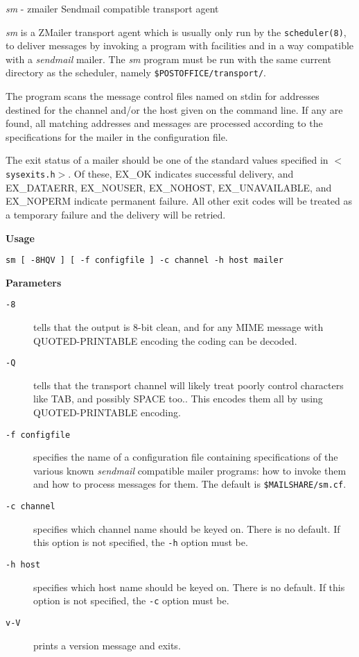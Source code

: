 {\em sm\/} - zmailer Sendmail compatible transport agent

{\em sm\/} is a ZMailer transport agent which is usually only run
by the {\tt scheduler(8)}, to deliver messages by invoking a
program with facilities and in a way compatible with a
{\em sendmail\/} mailer. The {\em sm\/} program must be run with the same
current directory as the scheduler, namely 
{\tt \$POSTOFFICE/transport/}.

The program scans the message control files named on stdin
for addresses destined for the channel and/or the host
given on the command line. If any are found, all matching
addresses and messages are processed according to the
specifications for the mailer in the configuration file.

The exit status of a mailer should be one of the standard
values specified in {\tt {\(<\)}sysexits.h{\(>\)}}. Of these, EX\_OK indicates 
successful delivery, and EX\_DATAERR, EX\_NOUSER,
EX\_NOHOST, EX\_UNAVAILABLE, and EX\_NOPERM indicate permanent 
failure. All other exit codes will be treated as a
temporary failure and the delivery will be retried.

{\bf Usage}

\begin{verbatim}
sm [ -8HQV ] [ -f configfile ] -c channel -h host mailer
\end{verbatim}

{\bf Parameters}

\begin{description}
\item[{\tt -8}] \mbox{}

tells that the output is 8-bit clean, and for any
MIME message with QUOTED-PRINTABLE encoding the
coding can be decoded.

\item[{\tt -Q}] \mbox{}

tells that the transport channel will likely treat
poorly control characters like TAB, and possibly
SPACE too.. This encodes them all by using QUOTED-PRINTABLE encoding.

\item[{\tt -f configfile}] \mbox{}

specifies the name of a configuration file containing 
specifications of the various known {\em sendmail\/}
compatible mailer programs: how to invoke them and
how to process messages for them. The default is {\tt \$MAILSHARE/sm.cf}.

\item[{\tt -c channel}] \mbox{}

specifies which channel name should be keyed on.
There is no default. If this option is not specified,
the {\tt -h} option must be.

\item[{\tt -h host}] \mbox{}

specifies which host name should be keyed on.
There is no default. If this option is not specified, the {\tt -c} option must be.

\item[{\tt v-V}] \mbox{}

prints a version message and exits.

\end{description}


